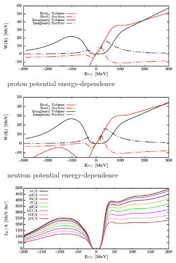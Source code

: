 \begin{figure}[hbtp]
    \begin{subfigure}[b]{0.45\textwidth}
        \centering
        \includegraphics[width=\linewidth]{figures/ni64_protonPotentials.png}
        \caption{\niFour\ proton potential energy-dependence}
        \label{DOMFitData_ni64_proton_potentialComponent_energy}
    \end{subfigure}\hspace{6pt}
    \begin{subfigure}[b]{0.45\linewidth}
        \centering
        \includegraphics[width=\linewidth]{figures/ni64_neutronPotentials.png}
        \caption{\niFour\ neutron potential energy-dependence}
        \label{DOMFitData_ni64_neutron_potentialComponent_energy}
    \end{subfigure}\vspace{0.3in}
    \begin{subfigure}[b]{0.45\textwidth}
        \centering
        \includegraphics[width=\linewidth]{figures/ni64_protonVolumeIntegrals.png}

\end{subfigure}
\end{figure}
